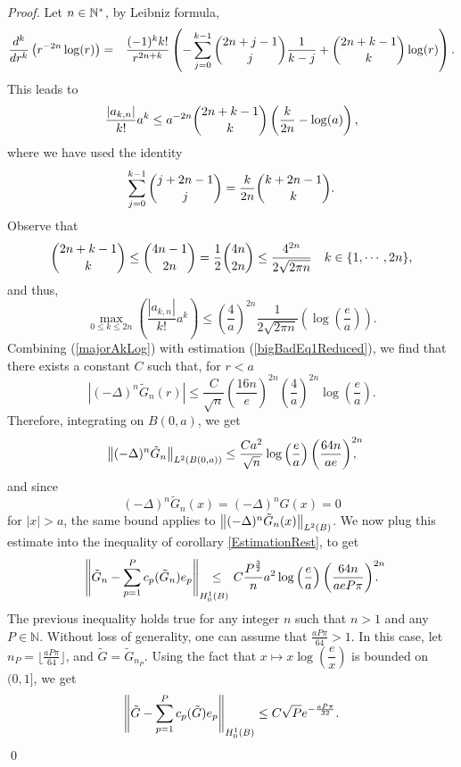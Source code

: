 \documentclass[smallextended]{svjour3}
\begin{document}
\begin{proof}
	Let $n \in \mathbb{N}^*$, by Leibniz formula, 
	\begin{eqnarray*}						
		\dfrac{d^k }{dr^k}\left(r^{-2n}\log(r)\right) & = & \dfrac{(-1)^k k!}{r^{2n+k}}  \left(-\displaystyle\sum_{j=0}^{k-1}\dbinom{2n+j-1}{j}\dfrac{1}{k-j}+\dbinom{2n+k-1}{k}\log(r)\right). \\
	\end{eqnarray*}
	This leads to \[\dfrac{|a_{k,n}|}{k!}a^k \leq a^{-2n} \dbinom{2n + k -1}{k}\left(\frac{k}{2n}-\log(a)\right),\]
	where we have used the identity
	\begin{equation*}
		\sum_{j=0}^{k-1}\dbinom{j+2n-1}{j} = \dfrac{k}{2n}\dbinom{k+2n-1}{k}.
	\end{equation*}
	Observe that
	\begin{equation*}
		\dbinom{2n+k-1}{k}\leq \dbinom{4n-1}{2n} = \frac{1}{2}\dbinom{4n}{2n} \leq \dfrac{4^{2n}}{2\sqrt{2\pi n}} \quad k \in \{1,\cdots,2n\},
	\end{equation*}
	and thus,
	\begin{equation}
		\max_{0\leq k \leq 2n}\left(\dfrac{|a_{k,n}|}{k!}a^k\right) \leq \left(\frac{4}{a}\right)^{2n}\dfrac{1}{2\sqrt{2\pi n}}\left(\log\left(\frac{e}{a}\right)\right).
		\label{majorAkLog} 
	\end{equation}							
	Combining (\ref{majorAkLog}) with estimation (\ref{bigBadEq1Reduced}), we find that there exists a constant $C$ such that, for $r<a$
	\[|(-\Delta)^n \tilde{G}_n (r)|\leq \dfrac{C}{\sqrt{n}}\left( \frac{16n}{e}\right)^{2n}\left(\frac{4}{a}\right)^{2n}\log\left(\dfrac{e}{a}\right).\]
	Therefore, integrating on $B(0,a)$, we get
	\[ \left\|(-\Delta)^n \tilde{G}_n\right\|_{L^2(B(0,a))} \leq \dfrac{C a^2}{\sqrt{n}}\log\left(\frac{e}{a}\right)\left( \frac{64n}{ae}\right)^{2n}\!\!\!\!\!\!,\]
	and since 
	\[(-\Delta)^n \tilde{G}_n(x) = (-\Delta)^n G(x) = 0\]
	for $|x|>a$, the same bound applies to $\left\|(-\Delta)^n \tilde{G}_n(x)\right\|_{L^2(B)}$. 
	We now plug this estimate into the inequality of corollary \ref{EstimationRest}, to get
	\[ \norm{\tilde{G}_n - \sum_{p=1}^{P}c_p(\tilde{G}_n)e_p}_{H^1_0(B)} \!\!\!\!\!\!\!\!\!\!\leq~~ C \dfrac{P^\frac{3}{2}}{n} a^2 \log\left(\dfrac{e}{a}\right)\left( \frac{64 n}{ae P \pi}\right)^{2n}\!\!\!\!\!\!.\] 
	The previous inequality holds true for any integer $n$ such that $n>1$ and any $P \in \mathbb{N}$. Without loss of generality, one can assume that $\frac{aP\pi}{64} >1$. In this case, let $n_P = \lfloor \frac{aP\pi}{64}\rfloor $, and $\tilde{G} = \tilde{G}_{n_P}$. Using the fact that $x\mapsto x \log\left(\dfrac{e}{x}\right)$ is bounded on $(0,1]$, we get 
	\[ \left\|\tilde{G} - \sum_{p=1}^{P}c_p(\tilde{G})e_p\right\|_{H^1_0(B)} \leq C \sqrt{P} e^{-\frac{aP\pi}{32}}.\]
	\qed
\end{proof}																												
\end{document}
